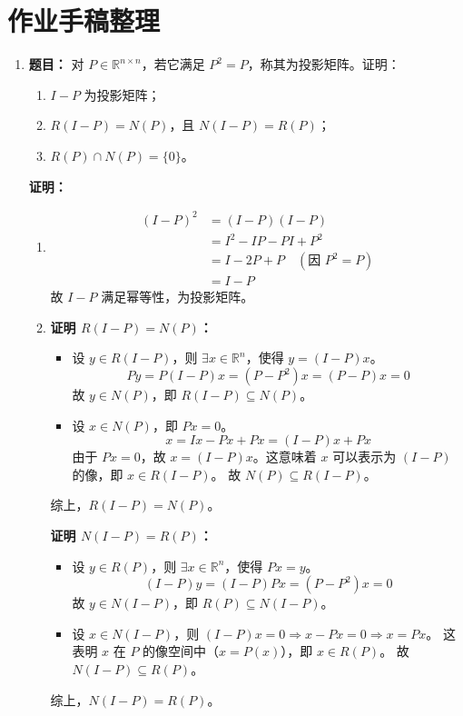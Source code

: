 \documentclass[12pt, a4paper]{article}
\newcommand{\Rn}{\mathbb{R}^{n \times n}}
\newcommand{\R}{\mathbb{R}}
\begin{document}
	
	\section*{作业手稿整理}
	
	\begin{enumerate}
		\item \textbf{题目：} 对 $P \in \Rn$，若它满足 $P^2 = P$，称其为投影矩阵。证明：
		\begin{enumerate}
			\item[(1)] $I-P$ 为投影矩阵；
			\item[(2)] $R(I-P) = N(P)$，且 $N(I-P) = R(P)$；
			\item[(3)] $R(P) \cap N(P) = \{0\}$。
		\end{enumerate}
		
		\textbf{证明：}
		
		\begin{enumerate}
			\item[(1)] 
			\begin{align*}
				(I-P)^2 &= (I-P)(I-P) \\
				&= I^2 - IP - PI + P^2 \\
				&= I - 2P + P \quad (\text{因 } P^2=P) \\
				&= I - P
			\end{align*}
			故 $I-P$ 满足幂等性，为投影矩阵。
			
			\item[(2)] \textbf{证明 $R(I-P) = N(P)$：}
			\begin{itemize}
				\item 设 $y \in R(I-P)$，则 $\exists x \in \R^n$，使得 $y = (I-P)x$。
				\[
				Py = P(I-P)x = (P - P^2)x = (P-P)x = 0
				\]
				故 $y \in N(P)$，即 $R(I-P) \subseteq N(P)$。
				
				\item 设 $x \in N(P)$，即 $Px = 0$。
				\[
				x = Ix - Px + Px = (I-P)x + Px
				\]
				由于 $Px=0$，故 $x = (I-P)x$。这意味着 $x$ 可以表示为 $(I-P)$ 的像，即 $x \in R(I-P)$。
				故 $N(P) \subseteq R(I-P)$。
			\end{itemize}
			综上，$R(I-P) = N(P)$。
			
			\textbf{证明 $N(I-P) = R(P)$：}
			\begin{itemize}
				\item 设 $y \in R(P)$，则 $\exists x \in \R^n$，使得 $Px = y$。
				\[
				(I-P)y = (I-P)Px = (P - P^2)x = 0
				\]
				故 $y \in N(I-P)$，即 $R(P) \subseteq N(I-P)$。
				
				\item 设 $x \in N(I-P)$，则 $(I-P)x = 0 \Rightarrow x - Px = 0 \Rightarrow x = Px$。
				这表明 $x$ 在 $P$ 的像空间中（$x = P(x)$），即 $x \in R(P)$。
				故 $N(I-P) \subseteq R(P)$。
			\end{itemize}
			综上，$N(I-P) = R(P)$。
			

\end{enumerate}
\end{enumerate}
\end{document}
